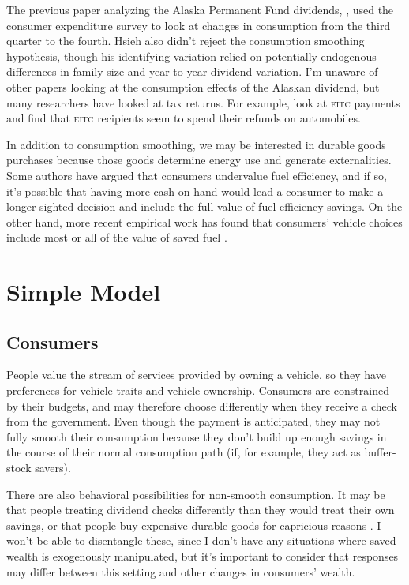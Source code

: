 \documentclass[11pt,letterpaper,oneside]{article}
\newcommand{\eitc}{\textsc{eitc}}
\begin{document}
\begin{doublespacing}
The previous paper analyzing the Alaska Permanent Fund dividends, \textcite{hsieh2003}, used the consumer expenditure survey to look at changes in consumption from the third quarter to the fourth.
Hsieh also didn't reject the consumption smoothing hypothesis, though his identifying variation relied on potentially\hyp{}endogenous differences in family size and year\hyp{}to\hyp{}year dividend variation.
I'm unaware of other papers looking at the consumption effects of the Alaskan dividend, but many researchers have looked at tax returns.
For example, \textcite{goodman2008eitc} look at \eitc{} payments and find that \eitc{} recipients seem to spend their refunds on automobiles.

In addition to consumption smoothing, we may be interested in durable goods purchases because those goods determine energy use and generate externalities.
Some authors have argued that consumers undervalue fuel efficiency, and if so, it's possible that having more cash on hand would lead a consumer to make a longer\hyp{}sighted decision and include the full value of fuel efficiency savings.
On the other hand, more recent empirical work has found that consumers' vehicle choices include most or all of the value of saved fuel \parencite{busse2013consumers, allcott2014gasoline, grigolon2014consumer, sallee2016consumers}.



\section{Simple Model}
\label{sec:model}

\subsection{Consumers}

People value the stream of services provided by owning a vehicle, so they have preferences for vehicle traits and vehicle ownership.
Consumers are constrained by their budgets, and may therefore choose differently when they receive a check from the government.
Even though the payment is anticipated, they may not fully smooth their consumption because they don't build up enough savings in the course of their normal consumption path (if, for example, they act as buffer\hyp{}stock savers).

There are also behavioral possibilities for non\hyp{}smooth consumption.
It may be that people treating dividend checks differently than they would treat their own savings, or that people buy expensive durable goods for capricious reasons \parencite{Busse2015_weather_on_cars}.
I won't be able to disentangle these, since I don't have any situations where saved wealth is exogenously manipulated, but it's important to consider that responses may differ between this setting and other changes in consumers' wealth.


\end{doublespacing}
\end{document}
